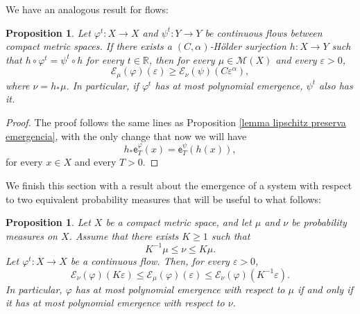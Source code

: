 \documentclass[11pt,reqno]{amsart}
\theoremstyle{plain}
\newtheorem{prop}[theorem]{Proposition}
\theoremstyle{definition}
\theoremstyle{remark}
\theoremstyle{plain}
\numberwithin{equation}{section}
\newcommand{\R}{\mathbb{R}}
\newcommand{\eps}{\varepsilon}
\begin{document}
						
						
We have an analogous result for flows: 
						
\begin{prop} \label{lemma lipschitz preserva emergencia para fluxos}
Let $\varphi^{t}\colon X \to X$ and $\psi^{t}\colon Y \to Y$ be continuous flows between compact metric spaces. If there exists a $(C,\alpha)$-H\"older surjection $h\colon X \to Y$ such that $h\circ \varphi^{t}=\psi^{t}\circ h$ for every $t\in \R$, then for every $\mu \in \mathcal{M}(X)$ and every $\eps>0$, $$  \mathcal{E}_{\mu}(\varphi)( \eps)\geq \mathcal{E}_{\nu}(\psi)(C\eps^\alpha),$$ where $\nu=h_{\ast}\mu$. In particular, if $\varphi^{t}$ has at most polynomial emergence, $\psi^{t}$ also has it.
						\end{prop}
						\begin{proof}
							The proof follows the same lines as Proposition \ref{lemma lipschitz preserva emergencia}, with the only change that now we will have $$h_{\ast}\mathsf{e}_{T}^{\varphi}(x)=\mathsf{e}^{\psi}_{T}(h(x)),$$ for every $x\in X$ and every $T>0$.
						\end{proof}	
						
						
We finish this section with a result about the emergence of a system with respect to two equivalent probability measures that will be useful to what follows:
						
\begin{prop}\label{prop: emergencia pol nao muda para medidas equiv}
Let $X$ be a compact metric space, and let $\mu$ and $\nu$ be probability
measures on $X$. Assume that there exists $K\geq 1$ such that
\begin{equation*}
K^{-1}\mu\leq \nu\leq K\mu.
\end{equation*}
Let $\varphi^{t}\colon X \to X$ be a continuous flow. Then, for every
$\varepsilon>0$,
\begin{equation*}
\mathcal{E}_{\nu}(\varphi)(K\varepsilon)
\leq
\mathcal{E}_{\mu}(\varphi)(\varepsilon)
\leq
\mathcal{E}_{\nu}(\varphi)(K^{-1}\varepsilon).
\end{equation*}
In particular, $\varphi$ has at most polynomial emergence with respect to
$\mu$ if and only if it has at most polynomial emergence with respect to
$\nu$.
\end{prop}
\end{document}
